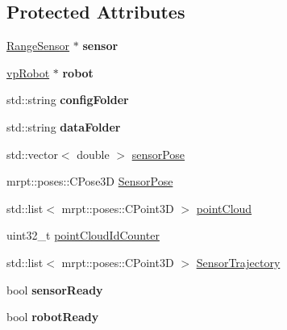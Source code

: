 \subsection*{Protected Attributes}
\begin{DoxyCompactItemize}
\item 
\hyperlink{classRangeSensor}{Range\+Sensor} $\ast$ {\bfseries sensor}\hypertarget{classRobotSensor_ac00737b26fc36d09497491988f6575e8}{}\label{classRobotSensor_ac00737b26fc36d09497491988f6575e8}

\item 
\hyperlink{classvpRobot}{vp\+Robot} $\ast$ {\bfseries robot}\hypertarget{classRobotSensor_ab416376e6423bb05d0d938eda2875b83}{}\label{classRobotSensor_ab416376e6423bb05d0d938eda2875b83}

\item 
std\+::string {\bfseries config\+Folder}\hypertarget{classRobotSensor_a3014b0bc086158cdbe1aca964f291b9a}{}\label{classRobotSensor_a3014b0bc086158cdbe1aca964f291b9a}

\item 
std\+::string {\bfseries data\+Folder}\hypertarget{classRobotSensor_a7c4a87715cac0b18bc7281cd3b0fa2fe}{}\label{classRobotSensor_a7c4a87715cac0b18bc7281cd3b0fa2fe}

\item 
std\+::vector$<$ double $>$ \hyperlink{classRobotSensor_a7e9d4be5f206d56109fc2e3c34e2aac2}{sensor\+Pose}
\item 
mrpt\+::poses\+::\+C\+Pose3D \hyperlink{classRobotSensor_a88bbdab74a1836ca367bcb344c4ca241}{Sensor\+Pose}
\item 
std\+::list$<$ mrpt\+::poses\+::\+C\+Point3D $>$ \hyperlink{classRobotSensor_a06d39a90daef29d623424b3608e0ee7b}{point\+Cloud}
\item 
uint32\+\_\+t \hyperlink{classRobotSensor_ae111af80a4feac4eb9ce0fbf740777c2}{point\+Cloud\+Id\+Counter}
\item 
std\+::list$<$ mrpt\+::poses\+::\+C\+Point3D $>$ \hyperlink{classRobotSensor_a47898d707a343c7530018493c87f3320}{Sensor\+Trajectory}
\item 
bool {\bfseries sensor\+Ready}\hypertarget{classRobotSensor_acaa1d9e26d7c609dc8374f1d1e474435}{}\label{classRobotSensor_acaa1d9e26d7c609dc8374f1d1e474435}

\item 
bool {\bfseries robot\+Ready}\hypertarget{classRobotSensor_a52448933140efcd8f8565ab02712fab4}{}\label{classRobotSensor_a52448933140efcd8f8565ab02712fab4}

\end{DoxyCompactItemize}


